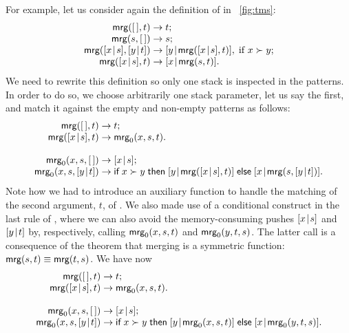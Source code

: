 For example, let us consider again the definition of  in
\fig~\vref{fig:tms}:
\begin{equation*}
\begin{array}{@{}r@{\;}l@{\;}l@{}}
\fun{mrg}(\el,t)         & \rightarrow & t;\\
\fun{mrg}(s,\el)         & \rightarrow & s;\\
\fun{mrg}(\cons{x}{s},\cons{y}{t}) & \rightarrow
                         & \cons{y}{\fun{mrg}(\cons{x}{s},t)},\;
                           \text{if \(x \succ y\)};\\
\fun{mrg}(\cons{x}{s},t) & \rightarrow & \cons{x}{\fun{mrg}(s,t)}.
\end{array}
\end{equation*}
We need to rewrite this definition so only one stack is inspected in
the patterns. In order to do so, we choose arbitrarily one stack
parameter, let us say the first, and match it against the empty and
non\hyp{}empty patterns as follows:
\begin{equation*}
\begin{array}{@{}r@{\;}l@{\;}l@{}}
\fun{mrg}(\el,t)         & \rightarrow & t;\\
\fun{mrg}(\cons{x}{s},t) & \rightarrow & \fun{mrg}_0(x,s,t).\\
\\
\fun{mrg}_0(x,s,\el)     & \rightarrow & \cons{x}{s};\\
\fun{mrg}_0(x,s,\cons{y}{t}) & \rightarrow
& \fun{if} \; x \succ y \; \fun{then} \;
  \cons{y}{\fun{mrg}(\cons{x}{s},t)} \;
  \fun{else} \; \cons{x}{\fun{mrg}(s,\cons{y}{t})}.
\end{array}
\end{equation*}
Note how we had to introduce an auxiliary function 
to handle the matching of the second argument, \(t\), of
. We also made use of a conditional construct in the last
rule of , where we can also avoid the
memory\hyp{}consuming pushes \([{x}\!\mid\!{s}]\) and \([{y}\!\mid\!{t}]\) by,
respectively, calling \(\textsf{mrg}_0(x,s,t)\) and
\(\textsf{mrg}_0(y,t,s)\). The latter call is a consequence of the
theorem that merging is a symmetric function: \(\textsf{mrg}(s,t) \equiv
\textsf{mrg}(t,s)\). We have now
\begin{equation*}
\begin{array}{@{}r@{\;}l@{\;}l@{}}
\fun{mrg}(\el,t)         & \rightarrow & t;\\
\fun{mrg}(\cons{x}{s},t) & \rightarrow & \fun{mrg}_0(x,s,t).\\
\\
\fun{mrg}_0(x,s,\el)     & \rightarrow & \cons{x}{s};\\
\fun{mrg}_0(x,s,\cons{y}{t}) & \rightarrow
& \fun{if} \; x \succ y \; \fun{then} \;
  \cons{y}{\fun{mrg}_0(x,s,t)} \;
  \fun{else} \; \cons{x}{\fun{mrg}_0(y,t,s)}.
\end{array}
\end{equation*}
